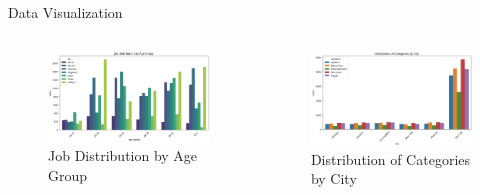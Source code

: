 \documentclass{beamer}
\begin{document}
\begin{frame}{Data Visualization}
    \begin{columns} %
        \begin{column}{0.5\textwidth}
            \begin{figure}
                \centering
                \includegraphics[width=1\textwidth]{images/job_age.png} %
                \caption{Job Distribution by Age Group}
            \end{figure}
        \end{column}
        
        \begin{column}{0.5\textwidth}
            \begin{figure}
                \centering
                \includegraphics[width=1\textwidth]{images/city.png} %
                \caption{Distribution of Categories by City}
            \end{figure}
        \end{column}
    \end{columns}
\end{frame}
\end{document}
